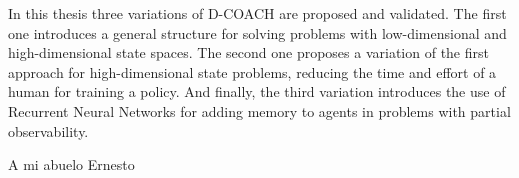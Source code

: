 \documentclass[upright, contnum]{umemoria}
\begin{document}
\begin{abstract_eng}
In this thesis three variations of D-COACH are proposed and validated. The first one introduces a general structure for solving problems with low-dimensional and high-dimensional state spaces. The second one proposes a variation of the first approach for high-dimensional state problems, reducing the time and effort of a human for training a policy. And finally, the third variation introduces the use of Recurrent Neural Networks for adding memory to agents in problems with partial observability.
\end{abstract_eng}


\begin{dedicatoria}
A mi abuelo Ernesto
\end{dedicatoria}

\begin{thanks}

\end{thanks}

\cleardoublepage
\tableofcontents
\cleardoublepage
\listoftables
\cleardoublepage
\listoffigures

\mainmatter








\newpage
{}




\end{document}
